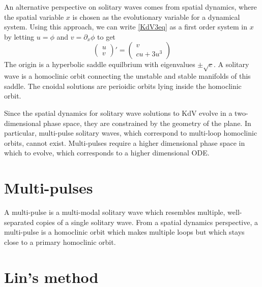 \documentclass[thesis.tex]{subfiles}
\begin{document}
An alternative perspective on solitary waves comes from spatial dynamics, where the spatial variable $x$ is chosen as the evolutionary variable for a dynamical system. Using this approach, we can write \cref{KdV3eq} as a first order system in $x$ by letting $u = \phi$ and $v = \partial_x \phi$ to get
\begin{equation}\label{KdV3sd}
\begin{pmatrix}u \\ v
\end{pmatrix}'
= \begin{pmatrix}
v \\ c u + 3 u^3
\end{pmatrix}
\end{equation}
The origin is a hyperbolic saddle equilbrium with eigenvalues $\pm \sqrt{c}$. A solitary wave is a homoclinic orbit connecting the unstable and stable manifolds of this saddle. The cnoidal solutions are perioidic orbits lying inside the homoclinic orbit.

Since the spatial dynamics for solitary wave solutions to KdV evolve in a two-dimensional phase space, they are constrained by the geometry of the plane. In particular, multi-pulse solitary waves, which correspond to multi-loop homoclinic orbits, cannot exist. Multi-pulses require a higher dimensional phase space in which to evolve, which corresponds to a higher dimensional ODE.

\section{Multi-pulses}

A multi-pulse is a multi-modal solitary wave which resembles multiple, well-separated copies of a single solitary wave. From a spatial dynamics perspective, a multi-pulse is a homoclinic orbit which makes multiple loops but which stays close to a primary homoclinic orbit.

\section{Lin's method}



\iffulldocument\else
	
	
\fi
\end{document}
